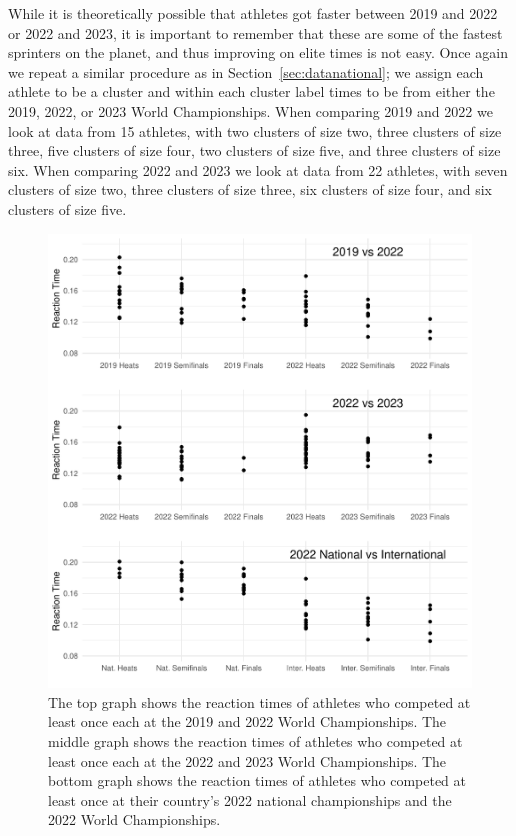 \documentclass[12pt, letterpaper, titlepage]{article}
\begin{document}
While it is theoretically possible that athletes got faster 
between 2019 and 2022 or 2022 and 2023, it is important to 
remember that these are some of the fastest sprinters on the planet, and thus
improving on elite times is not easy. Once again we repeat a similar procedure
as in Section~\ref{sec:datanational}; we assign each athlete to be a cluster and
within each cluster label times to be from either the 2019, 2022, or 2023 World
Championships. When comparing 2019 and 2022 we look at data from 15
athletes, with two clusters of size two, three clusters of size three, five 
clusters of size four, two clusters of size five, and three clusters of size six.
When comparing 2022 and 2023 we look at data from 22 athletes, with seven 
clusters of size two, three clusters of size three, six clusters of size four,
and six clusters of size five.

\begin{figure}[tbp]
  \centering
  \includegraphics{RankScatterPlots}
  \caption{The top graph shows the reaction times of athletes who competed at 
	least once each at the 2019 and 2022 World Championships. The middle graph 
	shows the reaction times of athletes who competed at least once each at the 
	2022 and 2023 World Championships. The bottom graph shows the reaction times 
	of athletes who competed at least once at their country's
        2022 national championships and the 2022 World Championships.}
  \label{fig:RankScatterplots}
\end{figure}
\end{document}

